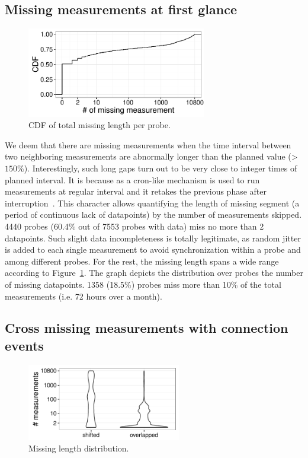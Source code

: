 \subsection{Missing measurements at first glance}
\begin{figure}
\centering
\includegraphics[width=0.7\textwidth]{gfx/chap3/missing_length_cdf.pdf}
\caption{CDF of total missing length per probe.}
\label{fig:miss_len}
\end{figure}
We deem that there are missing measurements when the time interval between two neighboring measurements are abnormally longer than the planned value (> $150\%$). 
Interestingly, such long gaps turn out to be very close to integer times of planned interval.
It is because as a cron-like mechanism is used to run measurements at regular interval and it retakes the previous phase after interruption~\cite{source, schedule}.
This character allows quantifying the length of missing segment (a period of continuous lack of datapoints) by the number of measurements skipped.
4440 probes (60.4\% out of 7553 probes with data) miss no more than 2 datapoints.
Such slight data incompleteness is totally legitimate, as random jitter is added to each single measurement to avoid synchronization within a probe and among different probes.
For the rest, the missing length spans a wide range according to Figure~\ref{fig:miss_len}.
The graph depicts the distribution over probes the number of missing datapoints.
1358 (18.5\%) probes miss more than 10\% of the total measurements (i.e. 72 hours over a month).

\subsection{Cross missing measurements with connection events}

\begin{figure}[!htb]
\centering
\includegraphics[width=0.6\textwidth]{gfx/chap3/len_by_ratio.pdf}
\caption{Missing length distribution.}
\label{fig:len_ratio}
\end{figure}

